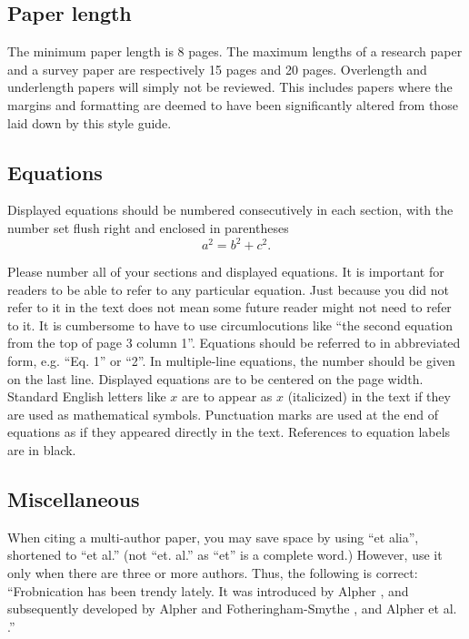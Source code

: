 \subsection{Paper length}
The minimum paper length is 8 pages. The maximum lengths of a research paper and a survey paper are respectively 15 pages and 20 pages. Overlength and underlength papers will simply not be reviewed. This includes papers where the margins and formatting are deemed to have been significantly altered from those laid down by this style guide.
\subsection{Equations}

Displayed equations should be numbered consecutively in each section, with the number set flush right and enclosed in parentheses
\begin{equation}
a^2 = b^2+c^2.
\end{equation}

Please number all of your sections and displayed equations. It is important for readers to be able to refer to any particular equation. Just because you did not refer to it in the text does not mean some future reader might not need to refer to it. It is cumbersome to have to use circumlocutions like “the second equation from the top of page 3 column 1”. Equations should be referred to in abbreviated form, e.g. “Eq. 1” or “2”. In multiple-line equations, the number should be given on the last line. Displayed equations are to be centered on the page width. Standard English letters like $x$ are to appear as $x$ (italicized) in the text if they are used as mathematical symbols. Punctuation marks are used at the end of equations as if they appeared directly in the text. References to equation labels are in black.
\subsection{Miscellaneous}

When citing a multi-author paper, you may save space by using “et alia”, shortened to “et al.” (not “et. al.” as “et” is a complete word.) However, use it only when there are three or more authors.  Thus, the following is correct: “Frobnication has been trendy lately. It was introduced by Alpher \cite{b1}, and subsequently developed by Alpher and Fotheringham-Smythe \cite{b2}, and Alpher et al. \cite{b3}.”

